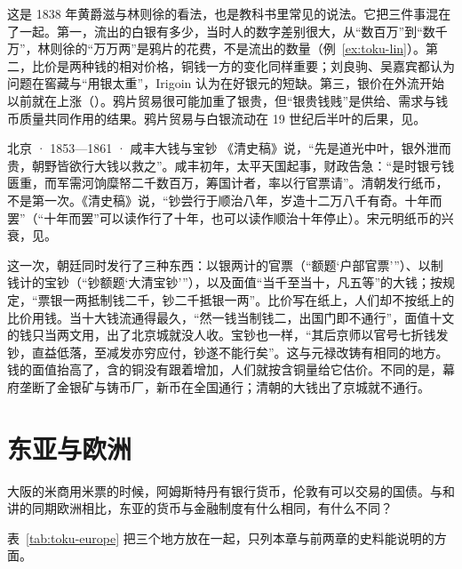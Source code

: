 \begin{pitfall}[银贵钱贱只是白银流出的结果]
这是 1838 年黄爵滋与林则徐的看法，也是教科书里常见的说法。它把三件事混在了一起。第一，流出的白银有多少，当时人的数字差别很大，从“数百万”到“数千万”，林则徐的“万万两”是鸦片的花费，不是流出的数量（例~\ref{ex:toku-lin}）。第二，比价是两种钱的相对价格，铜钱一方的变化同样重要；刘良驹、吴嘉宾都认为问题在窖藏与“用银太重”，Irigoin 认为在好银元的短缺。第三，银价在外流开始以前就在上涨（）。鸦片贸易很可能加重了银贵，但“银贵钱贱”是供给、需求与钱币质量共同作用的结果。鸦片贸易与白银流动在 19 世纪后半叶的后果，见。
\end{pitfall}

\begin{case}{北京 · 1853—1861 · 咸丰大钱与宝钞}
《清史稿》说，“先是道光中叶，银外泄而贵，朝野皆欲行大钱以救之”\cite{qingshigao}。咸丰初年，太平天国起事，财政告急：“是时银亏钱匮重，而军需河饷糜帑二千数百万，筹国计者，率以行官票请”\cite{qingshigao}。清朝发行纸币，不是第一次。《清史稿》说，“钞尝行于顺治八年，岁造十二万八千有奇。十年而罢”（“十年而罢”可以读作行了十年，也可以读作顺治十年停止）\cite{qingshigao}。宋元明纸币的兴衰，见。

这一次，朝廷同时发行了三种东西：以银两计的官票（“额题‘户部官票’”）、以制钱计的宝钞（“钞额题‘大清宝钞’”），以及面值“当千至当十，凡五等”的大钱；按规定，“票银一两抵制钱二千，钞二千抵银一两”\cite{qingshigao}。比价写在纸上，人们却不按纸上的比价用钱。当十大钱流通得最久，“然一钱当制钱二，出国门即不通行”\cite{qingshigao}，面值十文的钱只当两文用，出了北京城就没人收。宝钞也一样，“其后京师以官号七折钱发钞，直益低落，至减发亦穷应付，钞遂不能行矣”\cite{qingshigao}。这与元禄改铸有相同的地方。钱的面值抬高了，含的铜没有跟着增加，人们就按含铜量给它估价。不同的是，幕府垄断了金银矿与铸币厂，新币在全国通行；清朝的大钱出了京城就不通行。
\end{case}

\section{东亚与欧洲}\label{sec:toku-europe}

大阪的米商用米票的时候，阿姆斯特丹有银行货币，伦敦有可以交易的国债。与和讲的同期欧洲相比，东亚的货币与金融制度有什么相同，有什么不同？

表~\ref{tab:toku-europe} 把三个地方放在一起，只列本章与前两章的史料能说明的方面。

